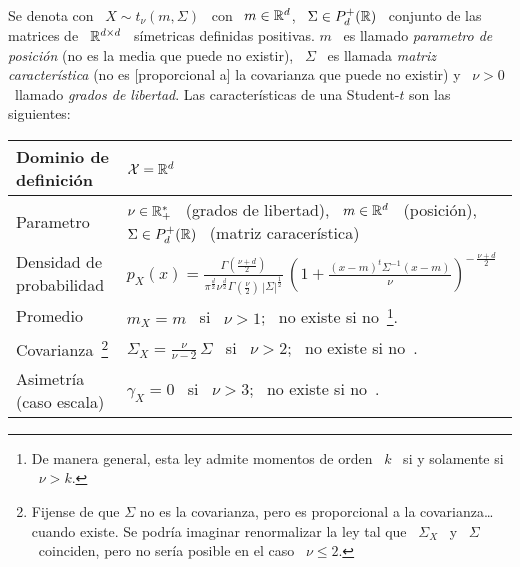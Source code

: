 Se denota con \ $X \sim t_\nu(m,\Sigma)$  \ con \ $m \in \mathbb{R}^d$, \ $\Sigma \in
P_d^+(\mathbb{R})$  \  conjunto  de  las   matrices  de  \  $\mathbb{R}^{d  \times  d}$  \
s\'imetricas definidas positivas. $m$ \ es llamado {\em parametro de posici\'on}
(no es  la media  que puede  no existir), \  $\Sigma$ \  es llamada  {\em matriz
  caracter\'istica} (no es [proporcional a]  la covarianza que puede no existir)
y \ $\nu > 0$ \ llamado  {\em grados de libertad}.  Las caracter\'isticas de una
Student-$t$ son las siguientes:
%
\begin{center}
\begin{tabular}
{
|>{\vspace{-2mm}}p{}|
>{\vspace{-2mm}\hspace{2mm}}p{}|
}
%
\hline
%
Dominio de definici\'on &
$\mathcal{X} = \mathbb{R}^d$\\[2mm]
\hline
%
Parametro & $\nu \in \mathbb{R}_+^*$ \ (grados de libertad), \ $m \in \mathbb{R}^d$ \
(posici\'on), \ $\Sigma \in P_d^+(\mathbb{R})$ \ (matriz caracer\'istica)\\[2mm]
\hline
%
Densidad de probabilidad & $\displaystyle p_X(x) = \frac{\Gamma\left(
\frac{\nu+d}{2} \right)}{\pi^{\frac{d}{2}} \nu^{\frac{d}{2}} \Gamma\left(
\frac{\nu}{2} \right) \, \left| \Sigma \right|^{\frac12}} \, \left( 1 +
\frac{(x-m)^t \Sigma^{-1} (x-m)}{\nu} \right)^{- \, \frac{\nu+d}{2}}$\\[2mm]
\hline
%
%
%
Promedio & $\displaystyle m_X = m$ \ si \ $\nu > 1$; \ no
existe si no~\footnote{De manera general, esta ley admite momentos de orden \ $k$ \
si y solamente si \ $\nu > k$.\label{Foot:MP:ExistenciaMomentosStudent}}.\\[2.5mm]
\hline
%
Covarianza~\footnote{Fijense de que $\Sigma$ no es la covarianza, pero es
proporcional a la covarianza\ldots cuando existe. Se podr\'ia imaginar
renormalizar la ley tal que \ $\Sigma_X$ \ y \ $\Sigma$ \ coinciden, pero no
ser\'ia posible en el caso \ $\nu \le 2$.} & $\displaystyle \Sigma_X =
\frac{\nu}{\nu-2} \, \Sigma$ \ si \ $\nu > 2$; \ no existe si
no~\footref{Foot:MP:ExistenciaMomentosStudent}.\\[2.5mm]
\hline
Asimetr\'ia (caso escala) & $\displaystyle \gamma_X = 0$ \ si \ $\nu > 3$; \ no
existe si no~\footref{Foot:MP:ExistenciaMomentosStudent}.\\[2mm]

\end{tabular}
\end{center}

